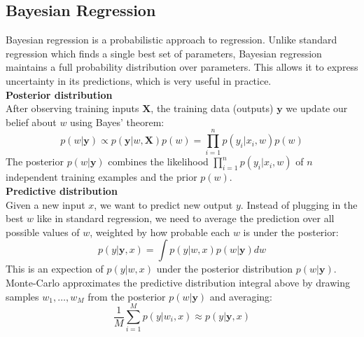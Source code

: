 \documentclass[../Probability.tex]{subfiles}
\begin{document}
\subsection{Bayesian Regression}
Bayesian regression is a probabilistic approach to regression. Unlike standard regression which finds a single best set of parameters, Bayesian regression maintains a full probability distribution over parameters.
This allows it to express uncertainty in its predictions, which is very useful in practice.\\
\textbf{Posterior distribution}\\
After observing training inputs $\mathbf{X}$, the training data (outputs) $\mathbf{y}$ we update our belief about $w$ using Bayes' theorem:
$$p(w|\mathbf{y}) \propto p(\mathbf{y}|w, \mathbf{X})p(w) = \prod_{i=1}^{n} p(y_i|x_i, w)p(w)$$
The posterior $p(w|\mathbf{y})$ combines the likelihood $\prod_{i=1}^{n} p(y_i|x_i, w)$ of $n$ independent training examples and the prior $p(w)$.\\
\textbf{Predictive distribution}\\
Given a new input $x$, we want to predict new output $y$.
Instead of plugging in the best $w$ like in standard regression, we need to average the prediction over all possible values of $w$, weighted by how probable each $w$ is under the posterior:
$$p(y|\mathbf{y}, x) = \int p(y|w, x)p(w|\mathbf{y})dw$$
This is an expection of $p(y|w,x)$ under the posterior distribution $p(w|\mathbf{y})$.\\
Monte-Carlo approximates the predictive distribution integral above by drawing samples $w_1,\ldots, w_M$ from the posterior $p(w|\mathbf{y})$ and averaging:
$$\frac{1}{M}\sum_{i=1}^{M} p(y|w_i, x) \approx p(y|\mathbf{y}, x)$$
\end{document}
